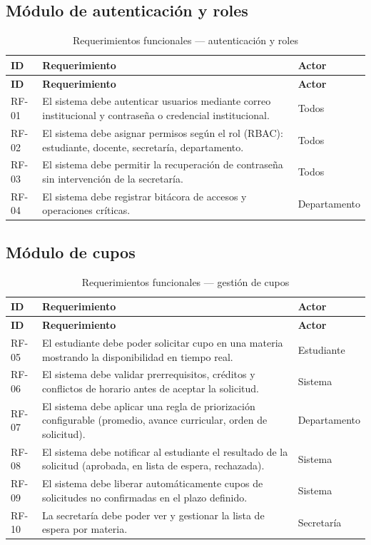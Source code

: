 \subsection{Módulo de autenticación y roles}

\begin{longtable}{@{}p{1.5cm} p{6.5cm} p{4.5cm}@{}}
\caption{Requerimientos funcionales --- autenticación y roles}
\label{tab:rf-auth}\\
\toprule
\rowcolor{azulClaro}
\textbf{ID} & \textbf{Requerimiento} & \textbf{Actor} \\
\midrule
\endfirsthead
\toprule
\rowcolor{azulClaro}
\textbf{ID} & \textbf{Requerimiento} & \textbf{Actor} \\
\midrule
\endhead
RF-01 & El sistema debe autenticar usuarios mediante correo institucional y contraseña o credencial institucional. & Todos \\
RF-02 & El sistema debe asignar permisos según el rol (\ac{RBAC}): estudiante, docente, secretaría, departamento. & Todos \\
RF-03 & El sistema debe permitir la recuperación de contraseña sin intervención de la secretaría. & Todos \\
RF-04 & El sistema debe registrar bitácora de accesos y operaciones críticas. & Departamento \\
\bottomrule
\end{longtable}

\subsection{Módulo de cupos}

\begin{longtable}{@{}p{1.5cm} p{6.5cm} p{4.5cm}@{}}
\caption{Requerimientos funcionales --- gestión de cupos}
\label{tab:rf-cupos}\\
\toprule
\rowcolor{verdeClaro}
\textbf{ID} & \textbf{Requerimiento} & \textbf{Actor} \\
\midrule
\endfirsthead
\toprule
\rowcolor{verdeClaro}
\textbf{ID} & \textbf{Requerimiento} & \textbf{Actor} \\
\midrule
\endhead
RF-05 & El estudiante debe poder solicitar cupo en una materia mostrando la disponibilidad en tiempo real. & Estudiante \\
RF-06 & El sistema debe validar prerrequisitos, créditos y conflictos de horario antes de aceptar la solicitud. & Sistema \\
RF-07 & El sistema debe aplicar una regla de priorización configurable (promedio, avance curricular, orden de solicitud). & Departamento \\
RF-08 & El sistema debe notificar al estudiante el resultado de la solicitud (aprobada, en lista de espera, rechazada). & Sistema \\
RF-09 & El sistema debe liberar automáticamente cupos de solicitudes no confirmadas en el plazo definido. & Sistema \\
RF-10 & La secretaría debe poder ver y gestionar la lista de espera por materia. & Secretaría \\
\bottomrule
\end{longtable}

